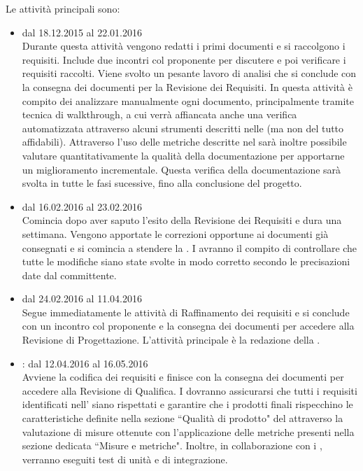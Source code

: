 \documentclass[a4paper, titlepage]{article}
\begin{document}
	Le attività principali sono:
	
	\begin{itemize}
		\item {} dal 18.12.2015 al 22.01.2016\\
		Durante questa attività vengono redatti i primi documenti e  si raccolgono i requisiti. Include due incontri col proponente per discutere e poi verificare i requisiti raccolti. Viene svolto un pesante lavoro di analisi che si conclude con la consegna dei documenti per la Revisione dei Requisiti. In questa attività è compito dei  analizzare manualmente ogni documento, principalmente tramite tecnica di walkthrough, a cui verrà affiancata anche una verifica automatizzata attraverso alcuni strumenti descritti nelle  (ma non del tutto affidabili).
		Attraverso l'uso delle metriche descritte nel  sarà inoltre possibile valutare quantitativamente la qualità della documentazione per apportarne un miglioramento incrementale. Questa verifica della documentazione sarà svolta in tutte le fasi sucessive, fino alla conclusione del progetto.
		
		\item {} dal 16.02.2016 al 23.02.2016\\
		Comincia dopo aver saputo l'esito della Revisione dei Requisiti e dura  una settimana. Vengono apportate le correzioni opportune ai documenti già consegnati e si comincia a stendere la . I  avranno il compito di controllare che tutte le modifiche siano state svolte in modo corretto secondo le precisazioni date dal committente.
		
		\item {} dal 24.02.2016 al 11.04.2016\\
		Segue immediatamente le attività di Raffinamento dei requisiti e si conclude con un incontro col proponente e la consegna dei documenti per accedere alla Revisione di Progettazione. L'attività principale è la redazione della .
		
		\item {}: dal 12.04.2016 al 16.05.2016\\
		Avviene la codifica dei requisiti e finisce con la consegna dei documenti per accedere alla Revisione di Qualifica. I  dovranno assicurarsi che tutti i requisiti identificati nell' siano rispettati e garantire che i prodotti finali rispecchino le caratteristiche definite nella sezione ``Qualità di prodotto" del  attraverso la valutazione di misure ottenute con l'applicazione delle metriche presenti nella sezione dedicata ``Misure e metriche". Inoltre, in collaborazione con i , verranno eseguiti test di unità e di integrazione.
		

\end{itemize}
\end{document}
